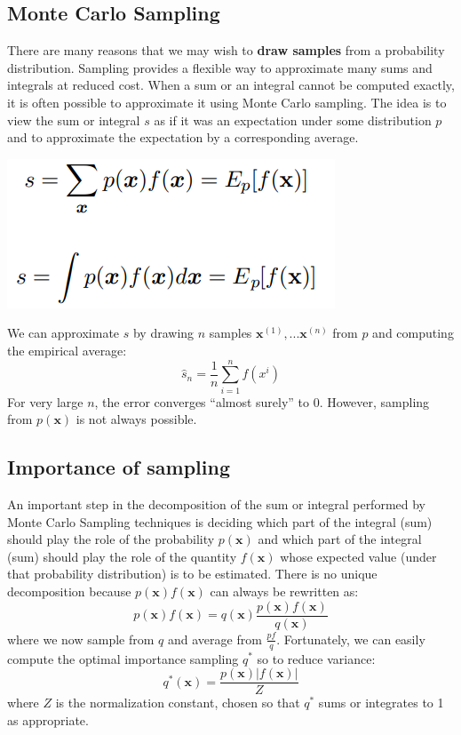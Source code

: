 \subsection{Monte Carlo Sampling}
There are many reasons that we may wish to \textbf{draw samples} from a probability distribution. Sampling provides a flexible way to approximate many sums and integrals at reduced cost.\newline\newline
When a sum or an integral cannot be computed exactly, it is often possible to approximate it using Monte Carlo sampling. The idea is to view the sum or integral $s$ as if it was an expectation under some distribution $p$ and to approximate the expectation by a corresponding average. 
\begin{center}
    \includegraphics[scale=0.8]{images/Monte carlo.png}
\end{center}
We can approximate $s$ by drawing $n$ samples $\textbf{x}^{(1)}, ... \textbf{x}^{(n)}$ from $p$ and computing the empirical average:
\[\hat{s}_n = \frac{1}{n}\sum_{i=1}^n f(x^{i})\]
For very large $n$, the error converges “almost surely” to 0. However, sampling from $p(\textbf{x})$ is not always possible.

\subsection{Importance of sampling}
An important step in the decomposition of the sum or integral performed by Monte Carlo Sampling techniques is deciding which part of the integral (sum) should play the role of the probability $p(\textbf{x})$ and which part of the integral (sum) should play the role of the quantity $f(\textbf{x})$ whose expected value (under that probability distribution) is to be estimated. There is no unique decomposition because $p(\textbf{x})f(\textbf{x})$ can always be rewritten as:
\[p(\textbf{x})f(\textbf{x}) = q(\textbf{x})\frac{p(\textbf{x})f(\textbf{x})}{q(\textbf{x})}\]
where we now sample from $q$ and average from $\frac{pf}{q}$. Fortunately, we can easily compute the optimal importance sampling $q^*$ so to reduce variance:
\[q^*(\textbf{x}) = \frac{p(\textbf{x})|f(\textbf{x})|}{Z}\]
where $Z$ is the normalization constant, chosen so that $q^*$ sums or integrates to
1 as appropriate.

